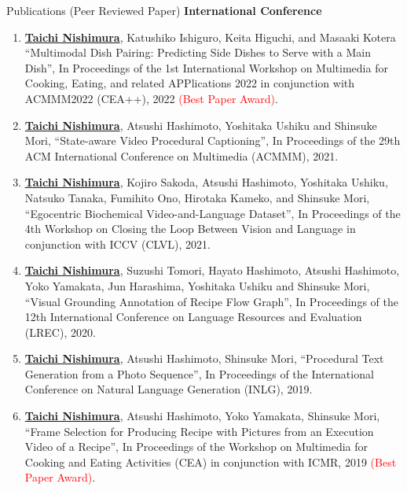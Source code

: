 \begin{rSection}{Publications (Peer Reviewed Paper)}
{\bf International Conference}
\vspace{-0.15cm}
\begin{enumerate}
    \item \underline{{\bf Taichi Nishimura}}, Katushiko Ishiguro, Keita Higuchi, and Masaaki Kotera ``Multimodal Dish Pairing: Predicting Side Dishes to Serve with a Main Dish'', In Proceedings of the 1st International Workshop on Multimedia for Cooking, Eating, and related APPlications 2022 in conjunction with ACMMM2022 (CEA++), 2022 \textcolor{red}{(Best Paper Award)}.
    \item \underline{{\bf Taichi Nishimura}}, Atsushi Hashimoto, Yoshitaka Ushiku and Shinsuke Mori, ``State-aware Video Procedural Captioning'', In Proceedings of the 29th ACM International Conference on Multimedia (ACMMM), 2021.
    \item \underline{{\bf Taichi Nishimura}}, Kojiro Sakoda, Atsushi Hashimoto, Yoshitaka Ushiku, Natsuko Tanaka, Fumihito Ono, Hirotaka Kameko, and Shinsuke Mori, ``Egocentric Biochemical Video-and-Language Dataset'', In Proceedings of the 4th Workshop on Closing the Loop Between Vision and Language in conjunction with ICCV (CLVL), 2021.
    \item \underline{{\bf Taichi Nishimura}}, Suzushi Tomori, Hayato Hashimoto, Atsushi Hashimoto, Yoko Yamakata, Jun Harashima, Yoshitaka Ushiku and Shinsuke Mori, ``Visual Grounding Annotation of Recipe Flow Graph'', In Proceedings of the 12th International Conference on Language Resources and Evaluation (LREC), 2020.
    \item \underline{{\bf Taichi Nishimura}}, Atsushi Hashimoto, Shinsuke Mori, ``Procedural Text Generation from a Photo Sequence'', In Proceedings of 
the International Conference on Natural Language Generation (INLG), 2019.
    \item \underline{{\bf Taichi Nishimura}}, Atsushi Hashimoto, Yoko Yamakata, Shinsuke Mori, ``Frame Selection for Producing Recipe with Pictures from an Execution Video of a Recipe'', In Proceedings of the Workshop on Multimedia for Cooking and Eating Activities (CEA) in conjunction with ICMR, 2019 \textcolor{red}{(Best Paper Award)}.
\end{enumerate}


\end{rSection}
